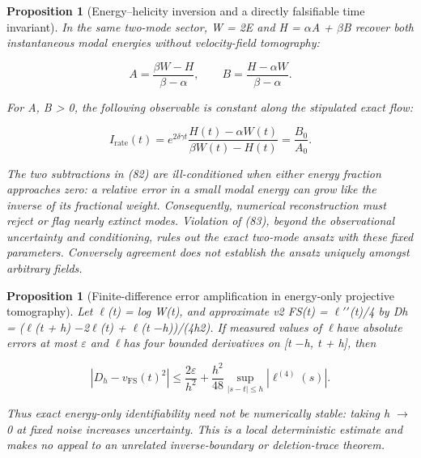 \documentclass[10pt,letterpaper]{article}
\newtheorem{proposition}[theorem]{Proposition}
\theoremstyle{remark}
\begin{document}
\begin{proposition}[Energy–helicity inversion and a directly falsifiable time invariant]

In the same two-mode sector, W = 2E and H = \(\alpha \)A + \(\beta \)B recover both instantaneous modal energies without velocity-field tomography:


\begin{equation}
\tag{82}\label{eq:82}
A=\frac{\beta W-H}{\beta-\alpha},\qquad B=\frac{H-\alpha W}{\beta-\alpha}.
\end{equation}

For A, B > 0, the following observable is constant along the stipulated exact flow:



\begin{equation}
\tag{83}\label{eq:83}
I_{\mathrm{rate}}(t)=e^{2\delta\gamma t}\frac{H(t)-\alpha W(t)}{\beta W(t)-H(t)}=\frac{B_0}{A_0}.
\end{equation}

The two subtractions in (82) are ill-conditioned when either energy fraction approaches zero: a relative error in a small modal energy can grow like the inverse of its fractional weight. Consequently, numerical reconstruction must reject or flag nearly extinct modes. Violation of (83), beyond the observational uncertainty and conditioning, rules out the exact two-mode ansatz with these fixed parameters. Conversely agreement does not establish the ansatz uniquely amongst arbitrary fields.


\end{proposition}

\begin{proposition}[Finite-difference error amplification in energy-only projective tomography]

Let \(\ell \)(t) = log W(t), and approximate v2 FS(t) = \(\ell \)\(\prime\)\(\prime\)(t)/4 by Dh = (\(\ell \)(t + h) \(- \)2\(\ell \)(t) + \(\ell \)(t \(- \)h))/(4h2). If measured values of \(\ell \)have absolute errors at most \(\varepsilon \) and \(\ell \)has four bounded derivatives on [t \(- \)h, t + h], then


\begin{equation}
\tag{84}\label{eq:84}
|D_h-v_{\mathrm{FS}}(t)^2|\le\frac{2\varepsilon}{h^2}+\frac{h^2}{48}\sup_{|s-t|\le h}|\ell^{(4)}(s)|.
\end{equation}

Thus exact energy-only identifiability need not be numerically stable: taking h \(\to \)0 at fixed noise increases uncertainty. This is a local deterministic estimate and makes no appeal to an unrelated inverse-boundary or deletion-trace theorem.


\end{proposition}
\end{document}
